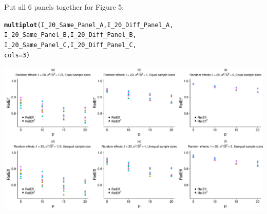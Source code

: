 \documentclass{article}\usepackage[]{graphicx}\usepackage[]{color}
\makeatletter
\def\maxwidth{ %
  \ifdim\Gin@nat@width>\linewidth
    \linewidth
  \else
    \Gin@nat@width
  \fi
}
\newcommand{\hlnum}[1]{\textcolor[rgb]{0.686,0.059,0.569}{#1}}%
\newcommand{\hlstd}[1]{\textcolor[rgb]{0.345,0.345,0.345}{#1}}%
\newcommand{\hlkwc}[1]{\textcolor[rgb]{0.333,0.667,0.333}{#1}}%
\newcommand{\hlkwd}[1]{\textcolor[rgb]{0.737,0.353,0.396}{\textbf{#1}}}%
\newenvironment{kframe}{%
 \def\at@end@of@kframe{}%
 \ifinner\ifhmode%
  \def\at@end@of@kframe{\end{minipage}}%
  \begin{minipage}{\columnwidth}%
 \fi\fi%
 \def\FrameCommand##1{\hskip\@totalleftmargin \hskip-\fboxsep
 \colorbox{shadecolor}{##1}\hskip-\fboxsep
     \hskip-\linewidth \hskip-\@totalleftmargin \hskip\columnwidth}%
 \MakeFramed {\advance\hsize-\width
   \@totalleftmargin\z@ \linewidth\hsize
   \@setminipage}}%
 {\par\unskip\endMakeFramed%
 \at@end@of@kframe}
\newenvironment{knitrout}{}{} %
\makeatother
\begin{document}
Put all 6 panels together for Figure 5:

\begin{knitrout}
\color{fgcolor}\begin{kframe}
\begin{alltt}
\hlkwd{multiplot}\hlstd{(I_20_Same_Panel_A, I_20_Diff_Panel_A,}
          \hlstd{I_20_Same_Panel_B, I_20_Diff_Panel_B,}
          \hlstd{I_20_Same_Panel_C, I_20_Diff_Panel_C,}
          \hlkwc{cols}\hlstd{=}\hlnum{3}\hlstd{)}
\end{alltt}
\end{kframe}

{\centering \includegraphics[width=\maxwidth]{figures/Boca_Figure_S5_panels-1} 

}



\end{knitrout}
\end{document}
